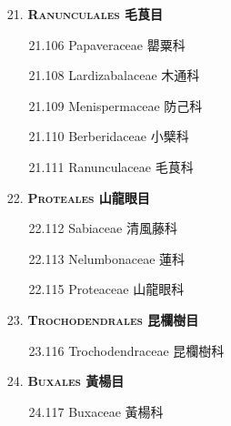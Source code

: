 \begin{enumerate}
  \item[21. ] \textbf{\textsc{Ranunculales} 毛茛目}   
    \begin{enumerate}
      \item[21.106] Papaveraceae 罌粟科     
        
      \item[21.108] Lardizabalaceae 木通科     
        
      \item[21.109] Menispermaceae 防己科     
        
      \item[21.110] Berberidaceae 小檗科     
        
      \item[21.111] Ranunculaceae 毛茛科     
        
    \end{enumerate}
  \item[22. ] \textbf{\textsc{Proteales} 山龍眼目}   
    \begin{enumerate}
      \item[22.112] Sabiaceae 清風藤科     
        
      \item[22.113] Nelumbonaceae 蓮科     
        
      \item[22.115] Proteaceae 山龍眼科     
        
    \end{enumerate}
  \item[23. ] \textbf{\textsc{Trochodendrales} 昆欄樹目}   
    \begin{enumerate}
      \item[23.116] Trochodendraceae 昆欄樹科     
        
    \end{enumerate}
  \item[24. ] \textbf{\textsc{Buxales} 黃楊目}   
    \begin{enumerate}
      \item[24.117] Buxaceae 黃楊科     
        
    \end{enumerate}
\end{enumerate}
